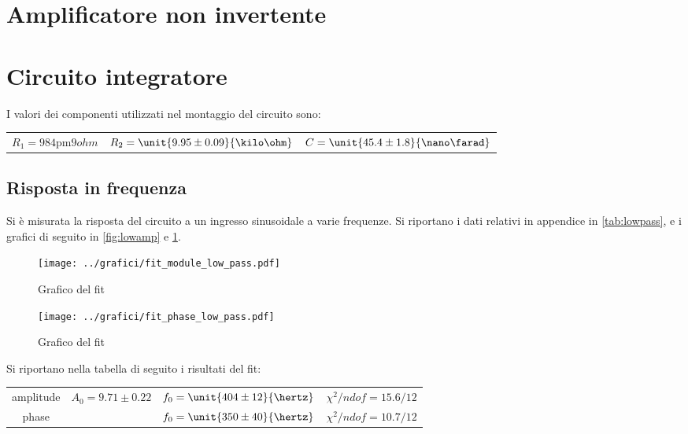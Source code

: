 \documentclass[10pt,a4paper]{article}
\begin{document}

\section{Amplificatore non invertente}

\section{Circuito integratore}

I valori dei componenti utilizzati nel montaggio del circuito sono:

\begin{table}[h!]
\centering
\begin{tabular}{ccc}
$R_1 = \unit{984 \pm 9}{ohm}$	&	$R_2 = \unit{9.95 \pm 0.09}{\kilo\ohm}$	&	$C = \unit{45.4 \pm 1.8}{\nano\farad}$
\end{tabular}
\end{table}

\subsection{Risposta in frequenza}
Si è misurata la risposta del circuito a un ingresso sinusoidale a varie frequenze. Si riportano i dati relativi in appendice in \tablename{\ref{tab:lowpass}}, e i grafici di seguito in \figurename{\ref{fig:lowamp}} e \figurename{\ref{fig:lowph}}.

\begin{figure}[h!]
\centering
	\begin{minipage}[h!]{0.48\textwidth}
		\centering
		\texttt{[image: ../grafici/fit\_module\_low\_pass.pdf]}
		\caption{Grafico del fit }
		\label{fig:lowamp}
	\end{minipage}
	\begin{minipage}[h!]{0.48\textwidth}
		\centering
		\texttt{[image: ../grafici/fit\_phase\_low\_pass.pdf]}
		\caption{Grafico del fit }
		\label{fig:lowph}
	\end{minipage}
\end{figure}

Si riportano nella tabella di seguito i risultati del fit:

\begin{table}[h!]
\centering
\begin{tabular}{c|ccc}
amplitude	&	$A_0 = 9.71 \pm 0.22$	&	$f_0 = \unit{404 \pm 12}{\hertz}$	&	$\chi^2/ndof = 15.6 / 12$\\
phase		& &	$f_0 = \unit{350 \pm 40}{\hertz}$	&	$\chi^2/ndof = 10.7 / 12$
\end{tabular}
\end{table}
\end{document}
